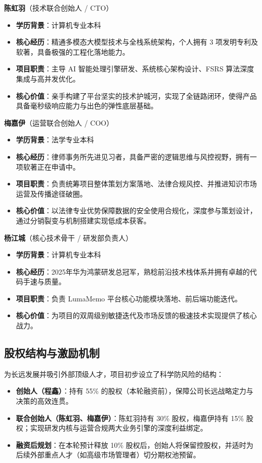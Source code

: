 \textbf{陈虹羽}（技术联合创始人 / CTO）
\begin{itemize}
    \item \textbf{学历背景}：计算机专业本科
    \item \textbf{核心经历}：精通多模态大模型技术与全栈系统架构，个人拥有 3 项发明专利及软著，具备极强的工程化落地能力。
    \item \textbf{项目职责}：主导 AI 智能处理引擎研发、系统核心架构设计、FSRS 算法深度集成与高并发优化。
    \item \textbf{核心价值}：亲手构建了平台坚实的技术护城河，实现了全链路闭环，使得产品具备毫秒级响应能力与出色的弹性底层基础。
\end{itemize}

\textbf{梅嘉伊}（运营联合创始人 / COO）
\begin{itemize}
    \item \textbf{学历背景}：法学专业本科
    \item \textbf{核心经历}：律师事务所先进见习者，具备严密的逻辑思维与风控视野，拥有一项软著正在申请中。
    \item \textbf{项目职责}：负责统筹项目整体策划方案落地、法律合规风控、并推进知识市场运营及传播途径破圈。
    \item \textbf{核心价值}：以法律专业优势保障数据的安全使用合规化，深度参与策划设计，通过分销裂变与机制搭建实现低成本获客。
\end{itemize}

\textbf{杨江城}（核心技术骨干 / 研发部负责人）
\begin{itemize}
    \item \textbf{学历背景}：计算机专业本科
    \item \textbf{核心经历}：2025年华为鸿蒙研发总冠军，熟稔前沿技术栈体系并拥有卓越的代码手速与质量。
    \item \textbf{项目职责}：负责 LumaMemo 平台核心功能模块落地、前后端功能迭代。
    \item \textbf{核心价值}：为项目的双周级别敏捷迭代及市场反馈的极速技术实现提供了核心战力。
\end{itemize}

\subsection{股权结构与激励机制}

为长远发展并吸引外部顶级人才，项目初步设立了科学防风险的结构：

\begin{itemize}
    \item \textbf{创始人（程鑫）}：持有 55\% 的股权（本轮融资前），保障公司长远战略定力与决策的高效连贯。
    \item \textbf{联合创始人（陈虹羽、梅嘉伊）}：陈虹羽持有 30\% 股权，梅嘉伊持有 15\% 股权；实现研发内核与运营合规两大业务引擎的深度利益绑定。
    \item \textbf{融资后规划}：在本轮预计释放 10\% 股权后，创始人将保留控股权，并适时为后续外部重点人才（如高级市场管理者）切分期权池预留。
\end{itemize}

